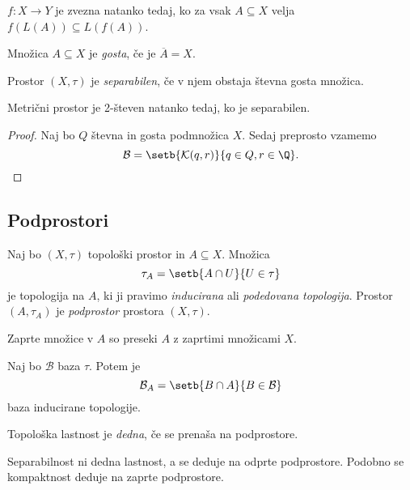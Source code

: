 \begin{trditev}
$f \colon X \to Y$ je zvezna natanko tedaj, ko za vsak
$A \subseteq X$ velja $f(L(A)) \subseteq L(f(A))$.
\end{trditev}


\begin{definicija}
Množica $A \subseteq X$ je \emph{gosta}, če je
$\overline{A} = X$.
\end{definicija}

\begin{definicija}
Prostor $(X, \tau)$ je
\emph{separabilen}, če v njem
obstaja števna gosta množica.
\end{definicija}

\begin{izrek}
Metrični prostor je 2-števen natanko tedaj, ko je separabilen.
\end{izrek}

\begin{proof}
Naj bo $Q$ števna in gosta podmnožica $X$. Sedaj preprosto vzamemo
\[
\mathcal{B} = \setb{\mathcal{K}(q,r)}{q \in Q, r \in \Q}. \qedhere
\]
\end{proof}

\newpage

\subsection{Podprostori}

\begin{definicija}
Naj bo $(X, \tau)$ topološki prostor in $A \subseteq X$. Množica
\[
\tau_A = \setb{A \cap U}{U \in \tau}
\]
je topologija na $A$, ki ji pravimo \emph{inducirana} ali
\emph{podedovana topologija}. Prostor
$(A, \tau_A)$ je
\emph{podprostor} prostora
$(X, \tau)$.
\end{definicija}

\begin{trditev}
Zaprte množice v $A$ so preseki $A$ z zaprtimi množicami $X$.
\end{trditev}

\obvs

\begin{trditev}
Naj bo $\mathcal{B}$ baza $\tau$. Potem je
\[
\mathcal{B}_A = \setb{B \cap A}{B \in \mathcal{B}}
\]
baza inducirane topologije.
\end{trditev}

\begin{definicija}
Topološka lastnost je
\emph{dedna}, če se
prenaša na podprostore.
\end{definicija}

\begin{opomba}
Separabilnost ni dedna lastnost, a se deduje na odprte podprostore.
Podobno se kompaktnost deduje na zaprte podprostore.
\end{opomba}
